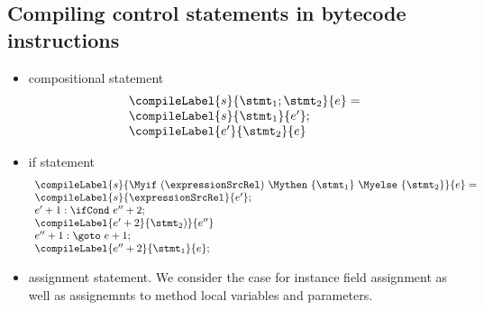 \subsection{Compiling control statements in bytecode instructions} \label{compCtrlStmt}
\begin{itemize}
  \item compositional statement 
      $$\begin{array}{l} \compileLabel{s}{\stmt_1; \stmt_2}{e} = \\  
      
            \compileLabel{s}{\stmt_1}{e'};\\
	    
	    \compileLabel{e'}{\stmt_2}{e}
       \end{array}$$
    
  \item   if statement
    $$\begin{array}{l} \compileLabel{s}{ \Myif \ ( \expressionSrcRel ) \ \Mythen \ \{ \stmt_1 \} \  \Myelse \ \{ \stmt_2 \}   }{e} =  \\
        
	    \compileLabel{s}{\expressionSrcRel}{e'}; \\
            e' + 1: \ifCond \ e'' + 2;\\
            \compileLabel{e' + 2}{\stmt_2)}{e''}\\
             e'' + 1: \goto \ e +  1; \\
            \compileLabel{e'' +  2}{\stmt_1}{ e  }; \\
	\end{array}
    $$


\item assignment statement. We consider the case for  instance field assignment as well as  assignemnts to method local variables and parameters. 

\end{itemize}
